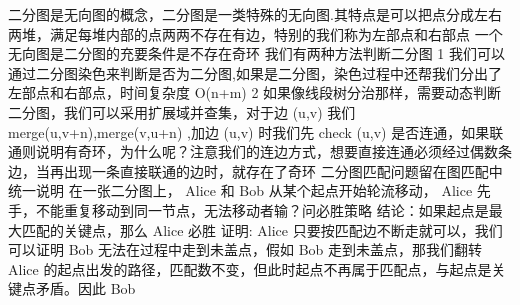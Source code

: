 \markdownRendererInterblockSeparator
{}二分图是无向图的概念，二分图是一类特殊的无向图.其特点是可以把点分成左右两堆，满足每堆内部的点两两不存在有边，特别的我们称为左部点和右部点\markdownRendererInterblockSeparator
{}\markdownRendererSectionBegin
{}\markdownRendererInterblockSeparator
{}一个无向图是二分图的充要条件是不存在奇环 我们有两种方法判断二分图\markdownRendererParagraphSeparator
{}\markdownRendererDollarSign{} 1 \markdownRendererDollarSign{}我们可以通过二分图染色来判断是否为二分图,如果是二分图，染色过程中还帮我们分出了左部点和右部点，时间复杂度\markdownRendererDollarSign{} O(n+m) \markdownRendererDollarSign{}\markdownRendererParagraphSeparator
{}\markdownRendererDollarSign{} 2 \markdownRendererDollarSign{}如果像线段树分治那样，需要动态判断二分图，我们可以采用扩展域并查集，对于边\markdownRendererDollarSign{} (u,v) \markdownRendererDollarSign{}我们\markdownRendererDollarSign{} merge(u,v+n),merge(v,u+n) \markdownRendererDollarSign{},加边\markdownRendererDollarSign{} (u,v) \markdownRendererDollarSign{}时我们先\markdownRendererDollarSign{} check\markdownRendererSoftLineBreak
{}\markdownRendererDollarSign{}\markdownRendererDollarSign{} (u,v) \markdownRendererDollarSign{}是否连通，如果联通则说明有奇环，为什么呢？注意我们的连边方式，想要直接连通必须经过偶数条边，当再出现一条直接联通的边时，就存在了奇环\markdownRendererInterblockSeparator
{}\markdownRendererSectionBegin
{}\markdownRendererInterblockSeparator
{}\markdownRendererInterblockSeparator
{}二分图匹配问题留在图匹配中统一说明\markdownRendererInterblockSeparator
{}
\markdownRendererSectionEnd 
\markdownRendererSectionEnd \markdownRendererSectionBegin
{}\markdownRendererInterblockSeparator
{}在一张二分图上，\markdownRendererDollarSign{} Alice\markdownRendererSoftLineBreak
{}\markdownRendererDollarSign{}和\markdownRendererDollarSign{} Bob \markdownRendererDollarSign{}从某个起点开始轮流移动，\markdownRendererDollarSign{} Alice \markdownRendererDollarSign{}先手，不能重复移动到同一节点，无法移动者输？问必胜策略\markdownRendererParagraphSeparator
{}结论：如果起点是最大匹配的关键点，那么\markdownRendererDollarSign{} Alice \markdownRendererDollarSign{}必胜\markdownRendererParagraphSeparator
{}证明:\markdownRendererDollarSign{} Alice \markdownRendererDollarSign{}只要按匹配边不断走就可以，我们可以证明\markdownRendererDollarSign{} Bob \markdownRendererDollarSign{}无法在过程中走到未盖点，假如\markdownRendererDollarSign{} Bob \markdownRendererDollarSign{}走到未盖点，那我们翻转\markdownRendererDollarSign{} Alice \markdownRendererDollarSign{}的起点出发的路径，匹配数不变，但此时起点不再属于匹配点，与起点是关键点矛盾。因此\markdownRendererDollarSign{} Bob\markdownRendererSoftLineBreak
